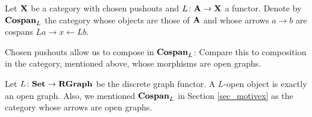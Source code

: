\documentclass[master]{subfiles}
\begin{document}
\begin{df} 
	Let $ \mathbf{X} $ be a category with chosen pushouts and $ L \colon \mathbf{A} \to \mathbf{X} $ a functor. Denote by $ \mathbf{Cospan}_{L} $ the category whose objects are those of $ \mathbf{A} $ and whose arrows $ a \to b $ are cospans $ L a \to x \gets L b $.
\end{df}

Chosen pushouts allow us to compose in $ \mathbf{Cospan}_{L} $:
Compare this to composition in the category, mentioned above, whose morphisms are open graphs.

\begin{ex}
	Let $ L \colon \mathbf{Set} \to \mathbf{RGraph} $ be the discrete graph functor. A $ L $-open object is exactly an open graph.  Also, we mentioned $ \mathbf{Cospan}_{L} $ in Section \ref{sec_motivex} as the category whose arrows are open graphs.  
\end{ex}
\end{document}
